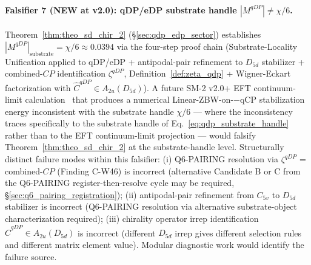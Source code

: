 \documentclass[11pt,letterpaper]{article}
\begin{document}
\paragraph{Falsifier 7 (NEW at v2.0): qDP/eDP substrate handle $|M^{qDP}| \neq \chi/6$.}
Theorem~\ref{thm:theo_sd_chir_2} (\S\ref{sec:qdp_edp_sector}) establishes $|M^{qDP}|_{\text{substrate}} = \chi/6 \approx 0.0394$ via the four-step proof chain (Substrate-Locality Unification applied to qDP/eDP + antipodal-pair refinement to $D_{5d}$ stabilizer + combined-$CP$ identification $\zeta^{qDP}$, Definition~\ref{def:zeta_qdp} + Wigner-Eckart factorization with $\hat{C}^{qDP} \in A_{2u}(D_{5d})$). A future SM-2 v2.0+ EFT continuum-limit calculation~\cite{abshier_sm2} that produces a numerical Linear-ZBW-on-$-$qCP stabilization energy inconsistent with the substrate handle $\chi/6$ --- where the inconsistency traces specifically to the substrate handle of Eq.~\eqref{eq:qdp_substrate_handle} rather than to the EFT continuum-limit projection --- would falsify Theorem~\ref{thm:theo_sd_chir_2} at the substrate-handle level. Structurally distinct failure modes within this falsifier: (i) Q6-PAIRING resolution via $\zeta^{qDP}$ = combined-$CP$ (Finding C-W46) is incorrect (alternative Candidate B or C from the Q6-PAIRING register-then-resolve cycle may be required, \S\ref{sec:q6_pairing_registration}); (ii) antipodal-pair refinement from $C_{5v}$ to $D_{5d}$ stabilizer is incorrect (Q6-PAIRING resolution via alternative substrate-object characterization required); (iii) chirality operator irrep identification $\hat{C}^{qDP} \in A_{2u}(D_{5d})$ is incorrect (different $D_{5d}$ irrep gives different selection rules and different matrix element value). Modular diagnostic work would identify the failure source.
\end{document}
